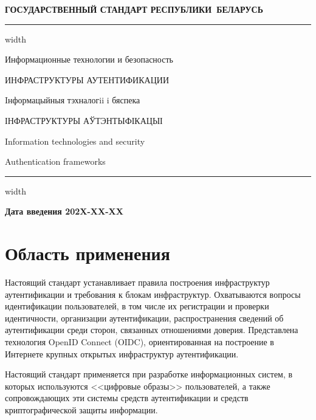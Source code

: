 \newpage
\setcounter{page}{1}
\pagestyle{headings}

\begin{center}
{\bfseries
ГОСУДАРСТВЕННЫЙ СТАНДАРТ РЕСПУБЛИКИ~БЕЛАРУСЬ
\vskip 2pt
\hrule width\textwidth

\vskip 9pt

Информационные технологии и безопасность

ИНФРАСТРУКТУРЫ АУТЕНТИФИКАЦИИ

\vskip 9pt

Iнформацыйныя тэхналогii i бяспека

ІНФРАСТРУКТУРЫ АЎТЭНТЫФІКАЦЫІ
}

\vskip 9pt

Information technologies and security

Authentication frameworks

\vskip 4pt                
\hrule width \textwidth
\end{center}

\mbox{}\hfill{\bfseries Дата введения 202X-XX-XX}

\chapter{Область применения}\label{Scope}

Настоящий стандарт устанавливает правила построения инфраструктур 
аутентификации и требования к блокам инфраструктур. 
%        
Охватываются вопросы идентификации пользователей, 
в том числе их регистрации и проверки идентичности, 
организации аутентификации, распространения сведений об
аутентификации среди сторон, связанных отношениями доверия. 
%
Представлена технология OpenID Connect (OIDC), ориентированная на построение
в Интернете крупных открытых инфраструктур аутентификации.

Настоящий стандарт применяется при разработке информационных систем,
в которых используются <<цифровые образы>> пользователей, а также 
сопровождающих эти системы средств аутентификации и средств криптографической 
защиты информации.

